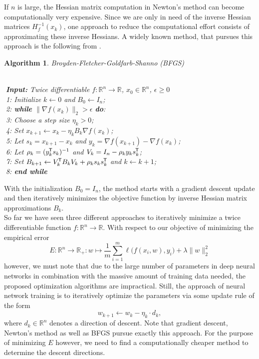 \documentclass[11pt, a4paper]{article}
\newtheorem{algorithm}[theorem]{Algorithm}
\newcommand{\R}{\mathbb{R}}
\newcommand*{\tr}{^{\mkern-1.5mu\mathsf{T}}}
\begin{document}
If $n$ is large, the Hessian matrix computation in Newton's method can become computationally very expensive. Since we are only in need of the inverse Hessian matrices $H_f^{-1}(x_k)$, one approach to reduce the computational effort consists of approximating these inverse Hessians. A widely known method, that pursues this approach is the following from \cite{BFGS}.

\begin{algorithm}
\caption{Broyden-Fletcher-Goldfarb-Shanno (BFGS) \textcolor{white}{$\Big |$}} \ \\
\textcolor{white}{$\Big |$}\textbf{Input:} Twice differentiable $f: \R^n \to \R$, $x_0 \in \R^n$, $\epsilon \geq 0$ \\
\textcolor{white}{$\Big |$}1: Initialize $k \leftarrow 0$ and $B_0 \leftarrow I_n$; \\
\textcolor{white}{$\Big |$}2: \textbf{while} $ \big \| \nabla f(x_k) \big \|_2 > \epsilon $ \textbf{do}: \\
\textcolor{white}{$\Big |$}3: \quad Choose a step size $\eta_k > 0$; \\
\textcolor{white}{$\Big |$}4: \quad Set $x_{k+1} \leftarrow x_k - \eta_k B_k \nabla f(x_{k})$; \\
\textcolor{white}{$\Big |$}5: \quad Let $s_k = x_{k+1} - x_{k}$ and $y_k = \nabla f(x_{k+1}) - \nabla f(x_{k})$; \\
\textcolor{white}{$\Big |$}6: \quad Let $\rho_k = (y_k\tr s_k)^{-1}$ and $V_k = I_n - \rho_k y_k s_k\tr $; \\
\textcolor{white}{$\Big |$}7: \quad Set $B_{k+1} \leftarrow V_k\tr B_{k}V_k + \rho_k s_k s_k\tr $ and $k \leftarrow k+1$; \\
\textcolor{white}{$\Big |$}8: \textbf{end while}
\end{algorithm}

With the initialization $B_0 = I_n$, the method starts with a gradient descent update and then iteratively minimizes the objective function by inverse Hessian matrix approximations $B_k$. \\

So far we have seen three different approaches to iteratively minimize a twice differentiable function $f: \R^n \to \R$. With respect to our objective of minimizing the empirical error
\[ E : \R^n \to \R_+ : w \mapsto \frac{1}{m} \sum_{i=1}^{m} \ell \big ( f(x_i,w),y_i \big) + \lambda \big \| w \big \|_2^2 \]
however, we must note that due to the large number of parameters in deep neural networks in combination with the massive amount of training data needed, the proposed optimization algorithms are impractical. Still, the approach of neural network training is to iteratively optimize the parameters via some update rule of the form
\[ w_{k+1} \leftarrow w_k - \eta_k \cdot d_k, \]
where $d_k \in \R^n$ denotes a direction of descent. Note that gradient descent, Newton's method as well as BFGS pursue exactly this approach. For the purpose of minimizing $E$ however, we need to find a computationally cheaper method to determine the descent directions. \\
\end{document}

